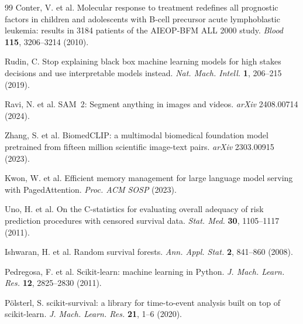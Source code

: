 \documentclass[pdflatex,sn-nature]{sn-jnl}
\begin{document}
\begin{thebibliography}{99}
Conter, V. et al.
Molecular response to treatment redefines all prognostic factors in
children and adolescents with B-cell precursor acute lymphoblastic
leukemia: results in 3184 patients of the AIEOP-BFM ALL 2000 study.
\textit{Blood} \textbf{115}, 3206--3214 (2010).

Rudin, C.
Stop explaining black box machine learning models for high stakes
decisions and use interpretable models instead.
\textit{Nat. Mach. Intell.} \textbf{1}, 206--215 (2019).

Ravi, N. et al.
SAM~2: Segment anything in images and videos.
\textit{arXiv} 2408.00714 (2024).

Zhang, S. et al.
BiomedCLIP: a multimodal biomedical foundation model pretrained from
fifteen million scientific image-text pairs.
\textit{arXiv} 2303.00915 (2023).

Kwon, W. et al.
Efficient memory management for large language model serving with
PagedAttention.
\textit{Proc. ACM SOSP} (2023).

Uno, H. et al.
On the C-statistics for evaluating overall adequacy of risk prediction
procedures with censored survival data.
\textit{Stat. Med.} \textbf{30}, 1105--1117 (2011).

Ishwaran, H. et al.
Random survival forests.
\textit{Ann. Appl. Stat.} \textbf{2}, 841--860 (2008).

Pedregosa, F. et al.
Scikit-learn: machine learning in Python.
\textit{J. Mach. Learn. Res.} \textbf{12}, 2825--2830 (2011).

P\"olsterl, S.
scikit-survival: a library for time-to-event analysis built on top
of scikit-learn.
\textit{J. Mach. Learn. Res.} \textbf{21}, 1--6 (2020).

\end{thebibliography}
\end{document}
